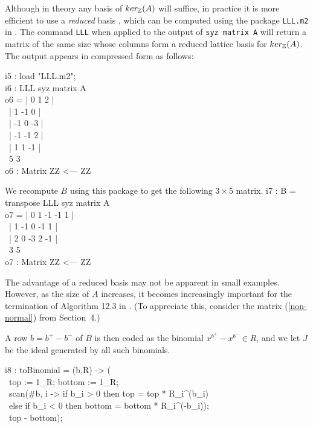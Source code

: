 Although in theory any basis of $ker_{\mathbb{Z}}(A)$ will suffice, in
practice it is more efficient to use a {\em reduced} basis
\cite[\S 6.2]{HS:Sch}, which can be computed using the {\em {}} package {\tt LLL.m2} in \Mtwo. The command {\tt LLL} 
when applied to the output of {\tt syz matrix A} will return a 
matrix of the same size whose columns form a reduced lattice basis 
for $ker_{\mathbb{Z}}(A)$. The output appears in compressed form as follows:

\beginOutput
i5 : load "LLL.m2"; \\
\endOutput
\beginOutput
i6 : LLL syz matrix A \\
\emptyLine
o6 = | 0  1  2  |\\
\     | 1  -1 0  |\\
\     | -1 0  -3 |\\
\     | -1 -1 2  |\\
\     | 1  1  -1 |\\
\emptyLine
\              5        3\\
o6 : Matrix ZZ  <--- ZZ\\
\endOutput

We recompute $B$ using this package to get the following $3 \times 5$ matrix.
\beginOutput
i7 : B = transpose LLL syz matrix A \\
\emptyLine
o7 = | 0 1  -1 -1 1  |\\
\     | 1 -1 0  -1 1  |\\
\     | 2 0  -3 2  -1 |\\
\emptyLine
\              3        5\\
o7 : Matrix ZZ  <--- ZZ\\
\endOutput

The advantage of a reduced basis may not be apparent in small
examples. However, as the size of $A$ increases, it becomes
increasingly important for the termination of Algorithm 12.3 in \cite{HS:St2}. (To
appreciate this, consider the matrix (\ref{non-normal}) from 
Section~4.)

A row $b = b^+ - b^-$ of $B$ is then coded as the binomial
$x^{b^+}-x^{b^-} \in R$, and we let $J$ be the ideal generated by all 
such binomials. 

\beginOutput
i8 : toBinomial = (b,R) -> (\\
\          top := 1_R; bottom := 1_R;\\
\          scan(#b, i -> if b_i > 0 then top = top * R_i^(b_i)\\
\               else if b_i < 0 then bottom = bottom * R_i^(-b_i));\\
\          top - bottom); \\
\endOutput


